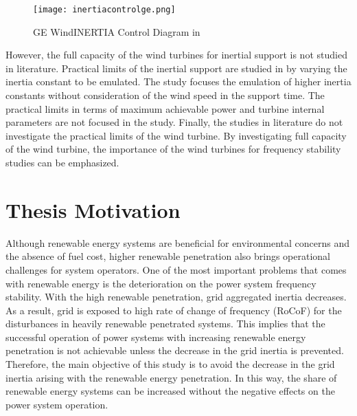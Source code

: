 \begin{figure}[h!]
	\centering
	\texttt{[image: inertiacontrolge.png]}
	\caption{GE WindINERTIA Control Diagram in \cite{Clark2009}}
	\label{inertiacontrolge}
\end{figure}
However, the full capacity of the wind turbines for inertial support is not studied in literature. Practical limits of the inertial support are studied in \cite{Gonzalez-Longatt2016} by varying the inertia constant to be emulated. The study focuses the emulation of higher inertia constants without consideration of the wind speed in the support time. The practical limits in terms of maximum achievable power and turbine internal parameters are not focused in the study. Finally, the studies in literature do not investigate the practical limits of the wind turbine. By investigating full capacity of the wind turbine, the importance of the wind turbines for frequency stability studies can be emphasized. 
\section{Thesis Motivation}
Although renewable energy systems are beneficial for environmental concerns and the absence of fuel cost, higher renewable penetration also brings operational challenges for system operators. One of the most important problems that comes with renewable energy is the deterioration on the power system frequency stability. With the high renewable penetration, grid aggregated inertia decreases. As a result, grid is exposed to high rate of change of frequency (RoCoF) for the disturbances in heavily renewable penetrated systems. This implies that the successful operation of power systems with increasing renewable energy penetration is not achievable unless the decrease in the grid inertia is prevented. Therefore, the main objective of this study is to avoid the decrease in the grid inertia arising with the renewable energy penetration. In this way, the share of renewable energy systems can be increased without the negative effects on the power system operation.

